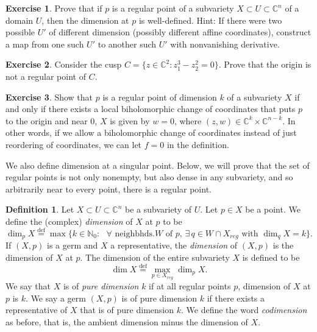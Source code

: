\documentclass[12pt,openany]{book}
\newcommand{\C}{{\mathbb{C}}}
\newcommand{\N}{{\mathbb{N}}}
\newcommand{\myindex}[1]{#1\index{#1}}
\theoremstyle{plain}
\theoremstyle{remark}
\theoremstyle{definition}
\newtheorem{defn}[thm]{Definition}
\newenvironment{exbox}{%
    \def\FrameCommand{\vrule width 1pt \relax\hspace{10pt}}%
    \MakeFramed{\advance\hsize-\width\FrameRestore}%
}{%
    \endMakeFramed
}
\theoremstyle{exercise}
\newtheorem{exercise}{Exercise}[section]
\theoremstyle{example}
\begin{document}
\begin{exbox}
\begin{exercise} \label{exercise:regdimwelldef}
Prove that if $p$ is a regular point of a subvariety $X \subset U \subset
\C^n$ of a domain $U$, then the dimension at $p$ is well-defined.  Hint: If there were two possible
$U'$ of different dimension (possibly different affine coordinates), construct a map
from one such $U'$ to another such $U'$ with nonvanishing derivative.
\end{exercise}

\begin{exercise}
Consider the cusp
$C = \bigl\{ z \in \C^2 : z_1^3-z_2^2 = 0 \bigr\}$.  Prove that
the origin is not a regular point of $C$.
\end{exercise}

\begin{exercise} \label{exercise:regularbiholomorphic}
Show that $p$ is a regular point of dimension $k$ of a subvariety $X$
if and only if there
exists a local biholomorphic change of coordinates that puts $p$ to the
origin and near $0$, $X$ is given by $w=0$, where $(z,w) \in \C^{k} \times
\C^{n-k}$.  In other words, if we allow a biholomorphic change of
coordinates instead of just reordering of coordinates,
we can let $f=0$ in the definition.
\end{exercise}
\end{exbox}

\pagebreak[2]
We also define dimension at a singular point.
Below, we will prove that the set of regular points is not only nonempty,
but also dense in any subvariety, and so arbitrarily near to every point,
there is a regular point.

\begin{defn}
Let $X \subset U \subset \C^n$ be a subvariety of $U$.  Let $p \in
X$ be a point.  We define the (complex)
\emph{\myindex{dimension}} of $X$ at $p$ to be
%
\begin{equation*}
\dim_p X \overset{\text{def}}{=}
\max \bigl\{ k \in \N_0 : \text{ $\forall$ neighbhds.
$W$ of $p$, $\exists \, q \in W \cap X_{\mathit{reg}}$ with $\dim_q X = k$}
\bigr\} .
\end{equation*}
If $(X,p)$ is a germ and $X$ a representative,
the \emph{dimension} of $(X,p)$ is the dimension of
$X$ at $p$.
The dimension of the entire subvariety $X$ is defined to be
%
\begin{equation*}
\dim X \overset{\text{def}}{=}
\max_{p \in X_{\mathit{reg}}} \dim_p X .
\end{equation*}
We say that $X$ is of \emph{\myindex{pure dimension}} $k$ if at
all regular points $p$, dimension of $X$ at $p$ is $k$.
We say a germ $(X,p)$ is of pure dimension $k$ if there exists a representative
of $X$ that is of pure dimension $k$.
We define the word \emph{codimension} as before, that is, the
ambient dimension minus the dimension of $X$.
\end{defn}
\end{document}
